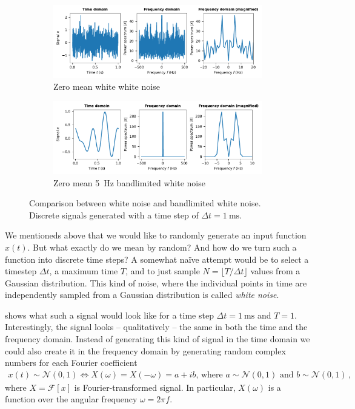 \documentclass[10pt,letterpaper,oneside]{article}
\begin{document}
\begin{figure}
	\centering
	\begin{subfigure}{\textwidth}
		\centering
		\includegraphics{media/white_noise.pdf}
		\caption{Zero mean white white noise}
		\label{fig:white_noise}
	\end{subfigure}
	\begin{subfigure}{\textwidth}
		\centering
		\includegraphics{media/white_noise_5hz.pdf}
		\caption{Zero mean \SI{5}{\hertz} bandlimited white noise}
		\label{fig:white_noise_5hz}
	\end{subfigure}
	\caption{Comparison between white noise and bandlimited white noise. Discrete signals generated with a time step of $\Delta t = \SI{1}{\milli\second}$. }
\end{figure}

We mentioneds above that we would like to randomly generate an input function $x(t)$. But what exactly do we mean by random? And how do we turn such a function into discrete time steps? A somewhat na\" ive attempt would be to select a timestep $\Delta t$, a maximum time $T$, and to just sample $N = \lfloor T / \Delta t \rfloor$ values from a Gaussian distribution. This kind of noise, where the individual points in time are independently sampled from a Gaussian distribution is called \emph{white noise}.

 shows what such a signal would look like for a time step $\Delta t = \SI{1}{\milli\second}$ and $T = 1$. Interestingly, the signal looks -- qualitatively -- the same in both the time and the frequency domain. Instead of generating this kind of signal in the time domain we could also create it in the frequency domain by generating random complex numbers for each Fourier coefficient
\begin{align*}
	x(t) \sim \mathcal{N}(0, 1) \Leftrightarrow X(\omega) = X(-\omega) = a + ib \text{, where } a \sim \mathcal{N}(0, 1) \text{ and } b \sim \mathcal{N}(0, 1) \,,
\end{align*}
where $X = \mathcal{F}[x]$ is Fourier-transformed signal. In particular, $X(\omega)$ is a function over the angular frequency $\omega = 2\pi f$.
\end{document}
